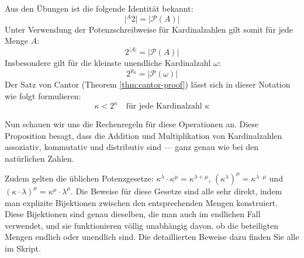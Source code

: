 \begin{math-stroke}
Aus den Übungen ist die folgende Identität bekannt:
\[
\bigl| {}^{A}2 \bigr| = |\mathcal{P}(A)|
\]
Unter Verwendung der Potenzschreibweise für Kardinalzahlen gilt somit für jede Menge $A$:
\[
2^{|A|} = |\mathcal{P}(A)|
\]
Insbesondere gilt für die kleinste unendliche Kardinalzahl $\omega$:
\[
2^{\aleph_0} = |\mathcal{P}(\omega)|
\]
Der Satz von Cantor (Theorem \ref{thm:cantor-proof}) lässt sich in dieser Notation wie folgt formulieren:
\begin{equation}\label{eq:cantor-arithmetic}
\kappa < 2^\kappa \quad \text{für jede Kardinalzahl } \kappa
\end{equation}
\end{math-stroke}

\begin{spoken-clean}[01:18:55 - 01:20:55]
Nun schauen wir uns die Rechenregeln für diese Operationen an. Diese Proposition besagt, dass die Addition und Multiplikation von Kardinalzahlen assoziativ, kommutativ und distributiv sind --- ganz genau wie bei den natürlichen Zahlen.

Zudem gelten die üblichen Potenzgesetze: $\kappa^\lambda \cdot \kappa^\mu = \kappa^{\lambda + \mu}$, $(\kappa^\lambda)^\mu = \kappa^{\lambda \cdot \mu}$ und $(\kappa \cdot \lambda)^\mu = \kappa^\mu \cdot \lambda^\mu$. Die Beweise für diese Gesetze sind alle sehr direkt, indem man explizite Bijektionen zwischen den entsprechenden Mengen konstruiert. Diese Bijektionen sind genau dieselben, die man auch im endlichen Fall verwendet, und sie funktionieren völlig unabhängig davon, ob die beteiligten Mengen endlich oder unendlich sind. Die detaillierten Beweise dazu finden Sie alle im Skript.
\end{spoken-clean}

\begin{math-stroke}
\end{math-stroke}

